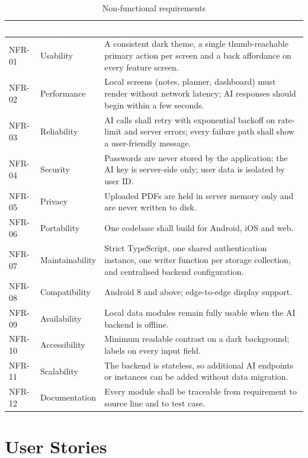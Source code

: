 \documentclass[12pt,a4paper,oneside]{report}
\begin{document}
\begin{table}[H]
\centering
\caption{Non-functional requirements}
\label{tab:nfr}
\small
\begin{tabularx}{\textwidth}{@{}p{1.5cm}p{2.7cm}X@{}}
\toprule
\rowcolor{tblhead} \textcolor{white}{\textbf{ID}} &
\textcolor{white}{\textbf{Category}} &
\textcolor{white}{\textbf{Requirement}} \\
\midrule
NFR-01 & Usability       & A consistent dark theme, a single thumb-reachable primary
   action per screen and a back affordance on every feature screen. \\
NFR-02 & Performance     & Local screens (notes, planner, dashboard) must render
   without network latency; AI responses should begin within a few seconds. \\
NFR-03 & Reliability     & AI calls shall retry with exponential backoff on rate-limit
   and server errors; every failure path shall show a user-friendly message. \\
NFR-04 & Security        & Passwords are never stored by the application; the AI key
   is server-side only; user data is isolated by user ID. \\
NFR-05 & Privacy         & Uploaded PDFs are held in server memory only and are never
   written to disk. \\
NFR-06 & Portability     & One codebase shall build for Android, iOS and web. \\
NFR-07 & Maintainability & Strict TypeScript, one shared authentication instance, one
   writer function per storage collection, and centralised backend configuration. \\
NFR-08 & Compatibility   & Android 8 and above; edge-to-edge display support. \\
NFR-09 & Availability    & Local data modules remain fully usable when the AI backend
   is offline. \\
NFR-10 & Accessibility   & Minimum readable contrast on a dark background; labels on
   every input field. \\
NFR-11 & Scalability     & The backend is stateless, so additional AI endpoints or
   instances can be added without data migration. \\
NFR-12 & Documentation   & Every module shall be traceable from requirement to source
   line and to test case. \\
\bottomrule
\end{tabularx}
\end{table}

\section{User Stories}
\end{document}

